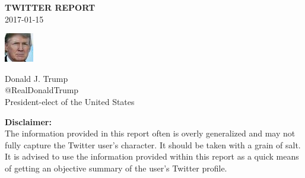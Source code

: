 \documentclass[12pt]{article}
\begin{document}
\vskip 0.6in
\begin{center}
\huge \textbf{TWITTER REPORT}\\
\small 2017-01-15\\
\end{center}
\vskip 1.5in
\begin{minipage}{0.5\textwidth}
\begin{center}
\includegraphics[width=0.8\linewidth]{prof_pic.jpg}
\end{center}
\end{minipage}
\hfill
\begin{minipage}{0.5\textwidth}\huge \noindent Donald J. Trump\\
\large @RealDonaldTrump\\
\large President-elect of the United States\\
\end{minipage}
\vskip 4.0in
\noindent \textbf{Disclaimer:}\\
\small The information provided in this report often is overly generalized and may not fully capture the Twitter user's character. It should be taken with a grain of salt. It is advised to use the information provided within this report as a quick means of getting an objective summary of the user's Twitter profile.
\newpage
\end{document}
